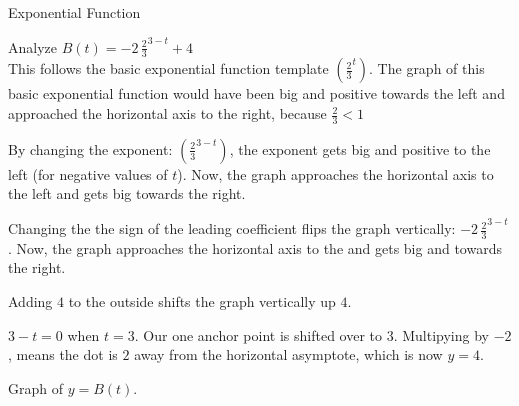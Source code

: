 \documentclass{ximera}
\begin{document}
\begin{example}  Exponential Function



Analyze   $B(t) = -2 \, \frac{2}{3}^{3-t} + 4$ \\



This follows the basic exponential function template $\left( \frac{2}{3}^t \right)$.  The graph of this basic exponential function would have been big and positive towards the left and approached the horizontal axis to the right, because $\frac{2}{3} < 1$




By changing the exponent: $\left( \frac{2}{3}^{3-t} \right)$, the exponent gets big and positive to the left (for negative values of $t$).  Now, the graph approaches the horizontal axis to the left and gets big towards the right.



Changing the the sign of the leading coefficient flips the graph vertically: $-2  \, \frac{2}{3}^{3-t}$.  Now, the graph approaches the horizontal axis to the   and gets big and  towards the right.


Adding $4$ to the outside shifts the graph vertically up $4$.


$3-t=0$ when $t=3$. Our one anchor point is shifted over to $3$.  Multipying by $-2$, means the dot is $2$ away from the horizontal asymptote, which is now $y=4$.





Graph of $y = B(t)$.

\begin{image}
\end{image}
\end{example}
\end{document}

